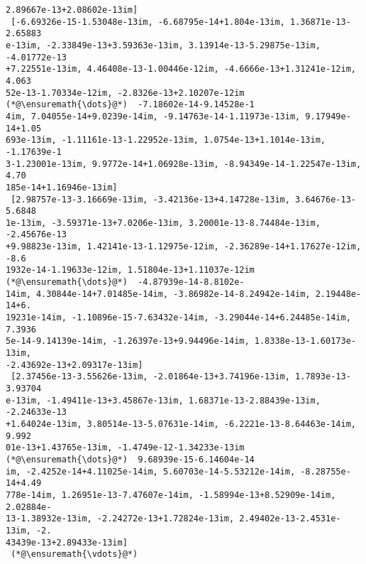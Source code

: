 \documentclass[12pt,a4paper]{article}
\begin{document}
\begin{lstlisting}
2.89667e-13+2.08602e-13im]   
 [-6.69326e-15-1.53048e-13im, -6.68795e-14+1.804e-13im, 1.36871e-13-2.65883
e-13im, -2.33849e-13+3.59363e-13im, 3.13914e-13-5.29875e-13im, -4.01772e-13
+7.22551e-13im, 4.46408e-13-1.00446e-12im, -4.6666e-13+1.31241e-12im, 4.063
52e-13-1.70334e-12im, -2.8326e-13+2.10207e-12im  (*@\ensuremath{\dots}@*)  -7.18602e-14-9.14528e-1
4im, 7.04055e-14+9.0239e-14im, -9.14763e-14-1.11973e-13im, 9.17949e-14+1.05
693e-13im, -1.11161e-13-1.22952e-13im, 1.0754e-13+1.1014e-13im, -1.17639e-1
3-1.23001e-13im, 9.9772e-14+1.06928e-13im, -8.94349e-14-1.22547e-13im, 4.70
185e-14+1.16946e-13im]       
 [2.98757e-13-3.16669e-13im, -3.42136e-13+4.14728e-13im, 3.64676e-13-5.6848
1e-13im, -3.59371e-13+7.0206e-13im, 3.20001e-13-8.74484e-13im, -2.45676e-13
+9.98823e-13im, 1.42141e-13-1.12975e-12im, -2.36289e-14+1.17627e-12im, -8.6
1932e-14-1.19633e-12im, 1.51804e-13+1.11037e-12im  (*@\ensuremath{\dots}@*)  -4.87939e-14-8.8102e-
14im, 4.30844e-14+7.01485e-14im, -3.86982e-14-8.24942e-14im, 2.19448e-14+6.
19231e-14im, -1.10896e-15-7.63432e-14im, -3.29044e-14+6.24485e-14im, 7.3936
5e-14-9.14139e-14im, -1.26397e-13+9.94496e-14im, 1.8338e-13-1.60173e-13im, 
-2.43692e-13+2.09317e-13im]  
 [2.37456e-13-3.55626e-13im, -2.01864e-13+3.74196e-13im, 1.7893e-13-3.93704
e-13im, -1.49411e-13+3.45867e-13im, 1.68371e-13-2.88439e-13im, -2.24633e-13
+1.64024e-13im, 3.80514e-13-5.07631e-14im, -6.2221e-13-8.64463e-14im, 9.992
01e-13+1.43765e-13im, -1.4749e-12-1.34233e-13im  (*@\ensuremath{\dots}@*)  9.68939e-15-6.14604e-14
im, -2.4252e-14+4.11025e-14im, 5.60703e-14-5.53212e-14im, -8.28755e-14+4.49
778e-14im, 1.26951e-13-7.47607e-14im, -1.58994e-13+8.52909e-14im, 2.02884e-
13-1.38932e-13im, -2.24272e-13+1.72824e-13im, 2.49402e-13-2.4531e-13im, -2.
43439e-13+2.89433e-13im]     
 (*@\ensuremath{\vdots}@*)                                                                         
                                                                           
                                                                           
                                                                           
                                                                           
                                                                           
                                                                           
                             

\end{lstlisting}
\end{document}
